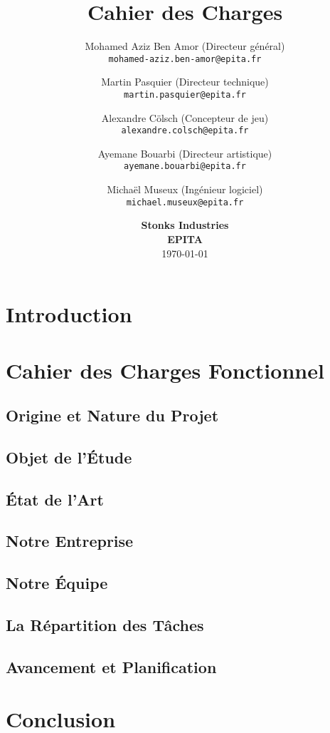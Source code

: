 \documentclass[11pt]{article}
\title{
    Cahier des Charges \\
    \textbf{\gameName}
    \vspace{6cm}
}
\author{
    Mohamed Aziz Ben Amor (Directeur général) \\
    \texttt{mohamed-aziz.ben-amor@epita.fr}
    \vspace{0.5cm}\and
    Martin Pasquier (Directeur technique) \\
    \texttt{martin.pasquier@epita.fr}
    \vspace{0.5cm}\and
    Alexandre Cölsch (Concepteur de jeu) \\
    \texttt{alexandre.colsch@epita.fr}
    \vspace{0.5cm}\and
    Ayemane Bouarbi (Directeur artistique) \\
    \texttt{ayemane.bouarbi@epita.fr}
    \vspace{0.5cm}\and
    Michaël Museux (Ingénieur logiciel) \\
    \texttt{michael.museux@epita.fr}
}
\date{
    \vspace{1.5cm}
    \textbf{Stonks Industries} \\
    \vspace{0.3cm}
    \textbf{EPITA} \\
    \vspace{1.5cm}
    \today
}
\begin{document}
\begin{titlepage}
    \maketitle
    \thispagestyle{empty} %
\end{titlepage}

\newpage
\thispagestyle{empty}
\mbox{}

\newpage
\tableofcontents

\newpage
\section{Introduction}




\newpage
\section{Cahier des Charges Fonctionnel}

\subsection{Origine et Nature du Projet}



\subsection{Objet de l'\'Etude}



\subsection{\'Etat de l'Art}



\subsection{Notre Entreprise}



\subsection{Notre \'Equipe}



\subsection{La Répartition des Tâches}



\subsection{Avancement et Planification}






\newpage
\section{Conclusion}


\end{document}
